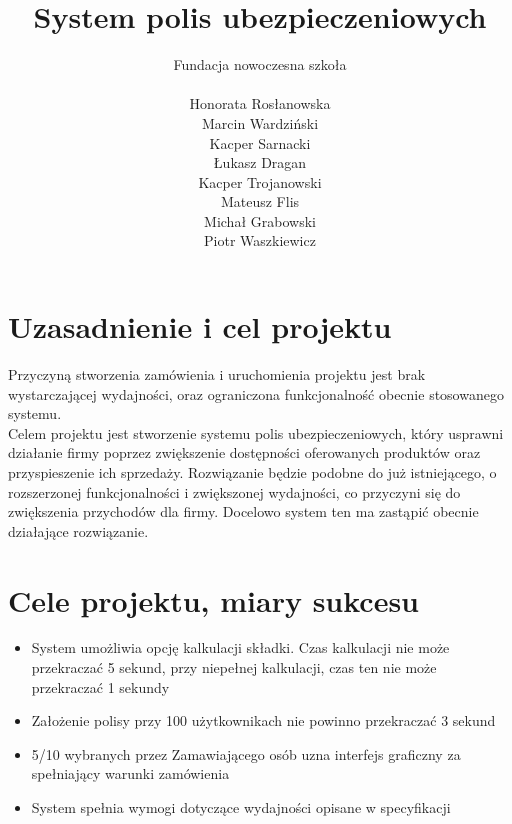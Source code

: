 \documentclass{article}
\author{Fundacja nowoczesna szkoła\\\\
Honorata Rosłanowska \\
Marcin Wardziński\\
Kacper Sarnacki \\
Łukasz Dragan \\
Kacper Trojanowski \\
Mateusz Flis \\
Michał Grabowski \\
Piotr Waszkiewicz}
\title{System polis ubezpieczeniowych}
\begin{document}
\maketitle
\newpage
\tableofcontents
\newpage

\section{Uzasadnienie i cel projektu}
Przyczyną stworzenia zamówienia i uruchomienia projektu jest brak wystarczającej wydajności, oraz ograniczona funkcjonalność obecnie stosowanego systemu. \\
Celem projektu jest stworzenie systemu polis ubezpieczeniowych, który usprawni działanie firmy poprzez zwiększenie dostępności oferowanych produktów oraz przyspieszenie ich sprzedaży. Rozwiązanie będzie podobne do już istniejącego, o rozszerzonej funkcjonalności i zwiększonej wydajności, co przyczyni się do zwiększenia przychodów dla firmy. Docelowo system ten ma zastąpić obecnie działające rozwiązanie.

\section{Cele projektu, miary sukcesu}
\begin{itemize}
	\item System umożliwia opcję kalkulacji składki. Czas kalkulacji nie może przekraczać 5 sekund, przy niepełnej kalkulacji, czas ten nie może przekraczać 1 sekundy
	\item Założenie polisy przy 100 użytkownikach nie powinno przekraczać 3 sekund
	\item 5/10 wybranych przez Zamawiającego osób uzna interfejs graficzny za spełniający warunki zamówienia
	\item System spełnia wymogi dotyczące wydajności opisane w specyfikacji
\end{itemize}
\end{document}
